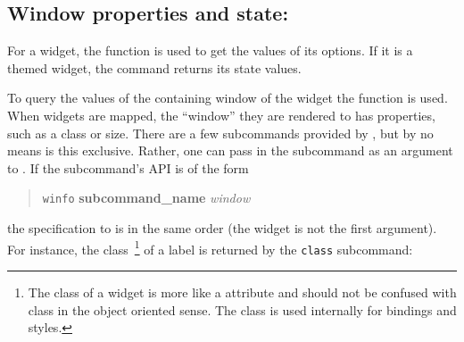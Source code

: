 







\subsection{Window properties and state: }
\label{sec:tcltk:overview:widget-properties}

For a widget, the function  is used to get the values
of its options. If it is a themed widget, the  command
returns its state values. 

To query the values of the containing window of the widget the
 function is used.  When widgets are mapped, the
``window'' they are rendered to has properties, such as a class or
size. There are a few subcommands provided by , but by no
means is this exclusive. Rather, one can pass in the subcommand as an
argument to . If the subcommand's API is of the form

\begin{quotation}
\texttt{winfo} \textbf{subcommand\_name} \textit{window}  
\end{quotation}
the specification to  is in the same order (the
widget is not the first argument). For instance, the
class~\footnote{The class of a widget is more like a attribute and should
  not be confused with class in the object oriented sense. The class
  is used internally for bindings and styles.} of a label
is returned by the \texttt{class} subcommand:

